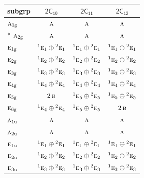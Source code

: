 \documentclass[10pt,a4paper]{article}
\numberwithin{equation}{section}
\newcommand{\grp}[1]{\mathsf{#1}}
\newcommand{\irr}[1]{\text{\normalfont\scshape #1}}
\newcommand{\conjpair}[1]{{}^{#1}}
\newcommand{\ptag}[1]{\mathrm{#1}}
\begin{document}
{\small\begin{longtable}{@{}lccc@{}}\toprule
subgrp & \href{2C10.pdf}{$\grp{2C_{10}}$} & \href{2C11.pdf}{$\grp{2C_{11}}$} & \href{2C12.pdf}{$\grp{2C_{12}}$}\\\midrule\endhead
\bottomrule\endfoot\endlastfoot
$\irr{a}_{1\ptag{g}}$ & $\irr{a}$ & $\irr{a}$ & $\irr{a}$\\*
$\irr{a}_{2\ptag{g}}$ & $\irr{a}$ & $\irr{a}$ & $\irr{a}$\\
$\irr{e}_{1\ptag{g}}$ & $\conjpair{1}\irr{e}_{1}\oplus \conjpair{2}\irr{e}_{1}$ & $\conjpair{1}\irr{e}_{1}\oplus \conjpair{2}\irr{e}_{1}$ & $\conjpair{1}\irr{e}_{1}\oplus \conjpair{2}\irr{e}_{1}$\\
$\irr{e}_{2\ptag{g}}$ & $\conjpair{1}\irr{e}_{2}\oplus \conjpair{2}\irr{e}_{2}$ & $\conjpair{1}\irr{e}_{2}\oplus \conjpair{2}\irr{e}_{2}$ & $\conjpair{1}\irr{e}_{2}\oplus \conjpair{2}\irr{e}_{2}$\\
$\irr{e}_{3\ptag{g}}$ & $\conjpair{1}\irr{e}_{3}\oplus \conjpair{2}\irr{e}_{3}$ & $\conjpair{1}\irr{e}_{3}\oplus \conjpair{2}\irr{e}_{3}$ & $\conjpair{1}\irr{e}_{3}\oplus \conjpair{2}\irr{e}_{3}$\\
$\irr{e}_{4\ptag{g}}$ & $\conjpair{1}\irr{e}_{4}\oplus \conjpair{2}\irr{e}_{4}$ & $\conjpair{1}\irr{e}_{4}\oplus \conjpair{2}\irr{e}_{4}$ & $\conjpair{1}\irr{e}_{4}\oplus \conjpair{2}\irr{e}_{4}$\\
$\irr{e}_{5\ptag{g}}$ & $2\,\irr{b}$ & $\conjpair{1}\irr{e}_{5}\oplus \conjpair{2}\irr{e}_{5}$ & $\conjpair{1}\irr{e}_{5}\oplus \conjpair{2}\irr{e}_{5}$\\
$\irr{e}_{6\ptag{g}}$ & $\conjpair{1}\irr{e}_{4}\oplus \conjpair{2}\irr{e}_{4}$ & $\conjpair{1}\irr{e}_{5}\oplus \conjpair{2}\irr{e}_{5}$ & $2\,\irr{b}$\\
$\irr{a}_{1\ptag{u}}$ & $\irr{a}$ & $\irr{a}$ & $\irr{a}$\\
$\irr{a}_{2\ptag{u}}$ & $\irr{a}$ & $\irr{a}$ & $\irr{a}$\\
$\irr{e}_{1\ptag{u}}$ & $\conjpair{1}\irr{e}_{1}\oplus \conjpair{2}\irr{e}_{1}$ & $\conjpair{1}\irr{e}_{1}\oplus \conjpair{2}\irr{e}_{1}$ & $\conjpair{1}\irr{e}_{1}\oplus \conjpair{2}\irr{e}_{1}$\\
$\irr{e}_{2\ptag{u}}$ & $\conjpair{1}\irr{e}_{2}\oplus \conjpair{2}\irr{e}_{2}$ & $\conjpair{1}\irr{e}_{2}\oplus \conjpair{2}\irr{e}_{2}$ & $\conjpair{1}\irr{e}_{2}\oplus \conjpair{2}\irr{e}_{2}$\\
$\irr{e}_{3\ptag{u}}$ & $\conjpair{1}\irr{e}_{3}\oplus \conjpair{2}\irr{e}_{3}$ & $\conjpair{1}\irr{e}_{3}\oplus \conjpair{2}\irr{e}_{3}$ & $\conjpair{1}\irr{e}_{3}\oplus \conjpair{2}\irr{e}_{3}$\\

\end{longtable}}
\end{document}
